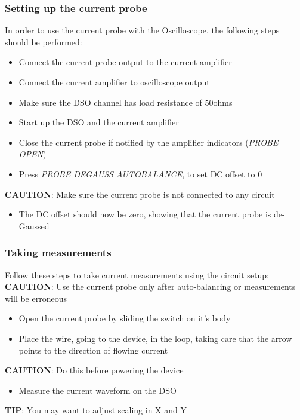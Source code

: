 \documentclass[a4paper]{article}
\begin{document}
\subsubsection{Setting up the current probe}
In order to use the current probe with the Oscilloscope, the following steps should be performed:
\begin{itemize}
	\item{Connect the current probe output to the current amplifier}
    \item{Connect the current amplifier to oscilloscope output}
	\item{Make sure the DSO channel has load resistance of 50ohms}
    \item{Start up the DSO and the current amplifier}
    \item{Close the current probe if notified by the amplifier indicators (\emph{PROBE OPEN})}
    \item{Press \emph{PROBE DEGAUSS AUTOBALANCE}, to set DC offset to 0}
\end{itemize}
\textbf{CAUTION}: Make sure the current probe is not connected to any circuit
\begin{itemize}
	\item{The DC offset should now be zero, showing that the current probe is de-Gaussed}
\end{itemize}

\subsubsection{Taking measurements}
Follow these steps to take current measurements using the circuit setup:
\linebreak
\linebreak
\textbf{CAUTION}: Use the current probe only after auto-balancing or measurements will be erroneous
\begin{itemize}
    \item{Open the current probe by sliding the switch on it's body}
    \item{Place the wire, going to the device, in the loop, taking care that the 
      arrow points to the direction of flowing current}
\end{itemize}
\textbf{CAUTION}: Do this before powering the device
\begin{itemize}
    \item{Measure the current waveform on the DSO}
\end{itemize}
\textbf{TIP}: You may want to adjust scaling in X and Y
\end{document}
